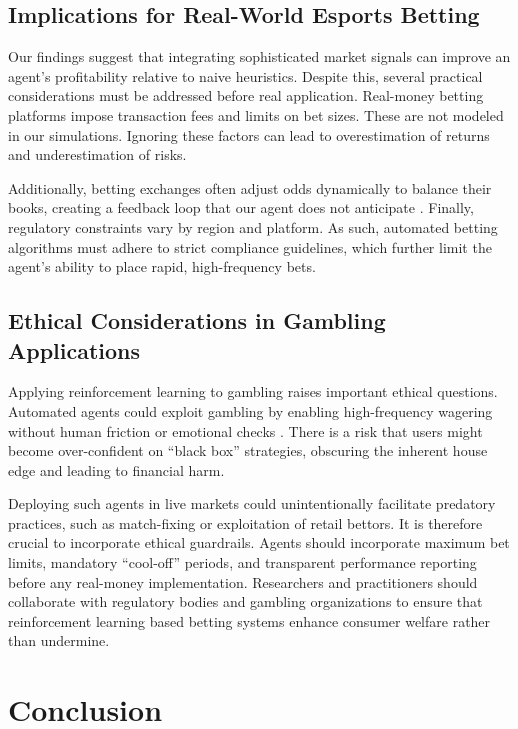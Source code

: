 \documentclass[sigconf]{acmart}
\begin{document}
\subsection{Implications for Real-World Esports Betting}

Our findings suggest that integrating sophisticated market signals can improve an agent's profitability relative to naive heuristics. Despite this, several practical considerations must be addressed before real application. Real-money betting platforms impose transaction fees and limits on bet sizes. These are not modeled in our simulations. Ignoring these factors can lead to overestimation of returns and underestimation of risks.

Additionally, betting exchanges often adjust odds dynamically to balance their books, creating a feedback loop that our agent does not anticipate \cite{jansen2020rlbetting}. Finally, regulatory constraints vary by region and platform. As such, automated betting algorithms must adhere to strict compliance guidelines, which further limit the agent's ability to place rapid, high-frequency bets.

\subsection{Ethical Considerations in Gambling Applications}

Applying reinforcement learning to gambling raises important ethical questions. Automated agents could exploit gambling by enabling high-frequency wagering without human friction or emotional checks \cite{king2019ethics}. There is a risk that users might become over-confident on “black box” strategies, obscuring the inherent house edge and leading to financial harm.

Deploying such agents in live markets could unintentionally facilitate predatory practices, such as match-fixing or exploitation of retail bettors. It is therefore crucial to incorporate ethical guardrails. Agents should incorporate maximum bet limits, mandatory “cool-off” periods, and transparent performance reporting before any real-money implementation. Researchers and practitioners should collaborate with regulatory bodies and gambling organizations to ensure that reinforcement learning based betting systems enhance consumer welfare rather than undermine.

\section{Conclusion}
\end{document}
